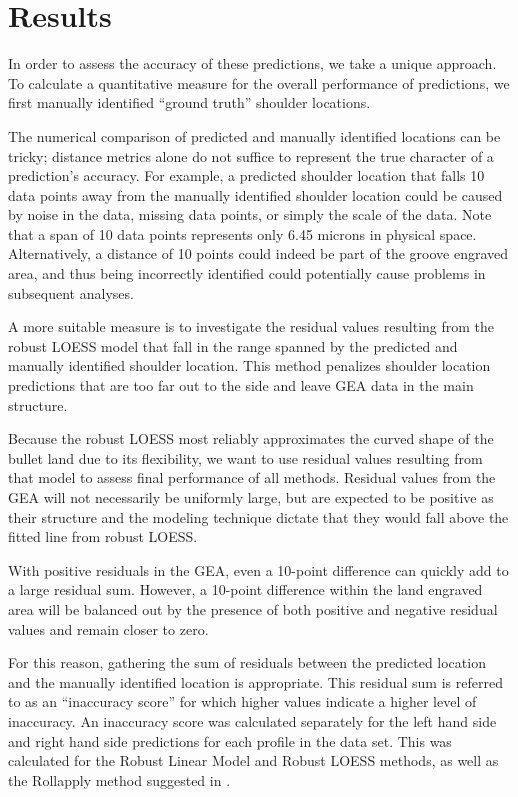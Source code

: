 \documentclass[]{article}
\begin{document}
\section{Results}

In order to assess the accuracy of these predictions, we take a unique
approach. To calculate a quantitative measure for the overall
performance of predictions, we first manually identified ``ground
truth'' shoulder locations.

The numerical comparison of predicted and manually identified locations
can be tricky; distance metrics alone do not suffice to represent the
true character of a prediction's accuracy. For example, a predicted
shoulder location that falls 10 data points away from the manually
identified shoulder location could be caused by noise in the data,
missing data points, or simply the scale of the data. Note that a span
of 10 data points represents only 6.45 microns in physical space.
Alternatively, a distance of 10 points could indeed be part of the
groove engraved area, and thus being incorrectly identified could
potentially cause problems in subsequent analyses.

A more suitable measure is to investigate the residual values resulting
from the robust LOESS model that fall in the range spanned by the
predicted and manually identified shoulder location. This method
penalizes shoulder location predictions that are too far out to the side
and leave GEA data in the main structure.

Because the robust LOESS most reliably approximates the curved shape of
the bullet land due to its flexibility, we want to use residual values
resulting from that model to assess final performance of all methods.
Residual values from the GEA will not necessarily be uniformly large,
but are expected to be positive as their structure and the modeling
technique dictate that they would fall above the fitted line from robust
LOESS.

With positive residuals in the GEA, even a 10-point difference can
quickly add to a large residual sum. However, a 10-point difference
within the land engraved area will be balanced out by the presence of
both positive and negative residual values and remain closer to zero.

For this reason, gathering the sum of residuals between the predicted
location and the manually identified location is appropriate. This
residual sum is referred to as an ``inaccuracy score'' for which higher
values indicate a higher level of inaccuracy. An inaccuracy score was
calculated separately for the left hand side and right hand side
predictions for each profile in the data set. This was calculated for
the Robust Linear Model and Robust LOESS methods, as well as the
Rollapply method suggested in \citet{Hare1}.
\end{document}
